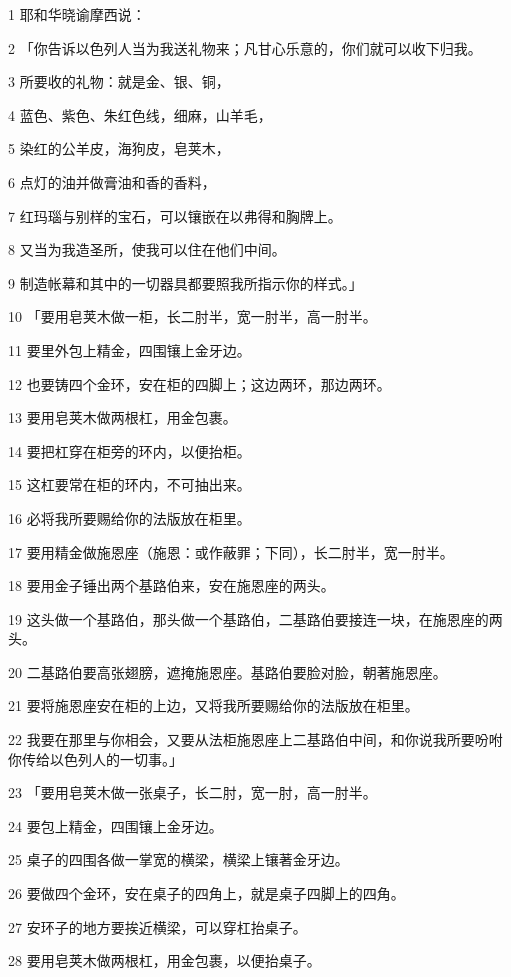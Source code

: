 \par 1 耶和华晓谕摩西说：
\par 2 「你告诉以色列人当为我送礼物来；凡甘心乐意的，你们就可以收下归我。
\par 3 所要收的礼物：就是金、银、铜，
\par 4 蓝色、紫色、朱红色线，细麻，山羊毛，
\par 5 染红的公羊皮，海狗皮，皂荚木，
\par 6 点灯的油并做膏油和香的香料，
\par 7 红玛瑙与别样的宝石，可以镶嵌在以弗得和胸牌上。
\par 8 又当为我造圣所，使我可以住在他们中间。
\par 9 制造帐幕和其中的一切器具都要照我所指示你的样式。」
\par 10 「要用皂荚木做一柜，长二肘半，宽一肘半，高一肘半。
\par 11 要里外包上精金，四围镶上金牙边。
\par 12 也要铸四个金环，安在柜的四脚上；这边两环，那边两环。
\par 13 要用皂荚木做两根杠，用金包裹。
\par 14 要把杠穿在柜旁的环内，以便抬柜。
\par 15 这杠要常在柜的环内，不可抽出来。
\par 16 必将我所要赐给你的法版放在柜里。
\par 17 要用精金做施恩座（施恩：或作蔽罪；下同），长二肘半，宽一肘半。
\par 18 要用金子锤出两个基路伯来，安在施恩座的两头。
\par 19 这头做一个基路伯，那头做一个基路伯，二基路伯要接连一块，在施恩座的两头。
\par 20 二基路伯要高张翅膀，遮掩施恩座。基路伯要脸对脸，朝著施恩座。
\par 21 要将施恩座安在柜的上边，又将我所要赐给你的法版放在柜里。
\par 22 我要在那里与你相会，又要从法柜施恩座上二基路伯中间，和你说我所要吩咐你传给以色列人的一切事。」
\par 23 「要用皂荚木做一张桌子，长二肘，宽一肘，高一肘半。
\par 24 要包上精金，四围镶上金牙边。
\par 25 桌子的四围各做一掌宽的横梁，横梁上镶著金牙边。
\par 26 要做四个金环，安在桌子的四角上，就是桌子四脚上的四角。
\par 27 安环子的地方要挨近横梁，可以穿杠抬桌子。
\par 28 要用皂荚木做两根杠，用金包裹，以便抬桌子。
